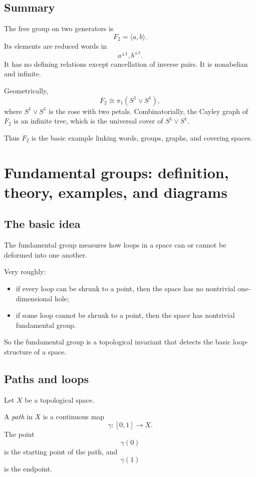 \documentclass[12pt,a4paper]{article}
\theoremstyle{notespace}
\begin{document}
\bigskip

\subsection{ Summary}

The free group on two generators is
\[
F_2=\langle a,b\rangle.
\]
Its elements are reduced words in
\[
a^{\pm1},b^{\pm1}.
\]
It has no defining relations except cancellation of inverse pairs. It is nonabelian and infinite.

Geometrically,
\[
F_2\cong \pi_1(S^1\vee S^1),
\]
where \(S^1\vee S^1\) is the rose with two petals. Combinatorially, the Cayley graph of \(F_2\) is an infinite tree, which is the universal cover of \(S^1\vee S^1\).

Thus \(F_2\) is the basic example linking words, groups, graphs, and covering spaces.

\section{Fundamental groups: definition, theory, examples, and diagrams}

\subsection{The basic idea}

The fundamental group measures how loops in a space can or cannot be deformed into one another.

Very roughly:
\begin{itemize}
	\item if every loop can be shrunk to a point, then the space has no nontrivial one-dimensional hole;
	\item if some loop cannot be shrunk to a point, then the space has nontrivial fundamental group.
\end{itemize}

So the fundamental group is a topological invariant that detects the basic loop-structure of a space.

\bigskip

\subsection{Paths and loops}

Let \(X\) be a topological space.

A \emph{path} in \(X\) is a continuous map
\[
\gamma:[0,1]\to X.
\]
The point
\[
\gamma(0)
\]
is the starting point of the path, and
\[
\gamma(1)
\]
is the endpoint.
\end{document}
